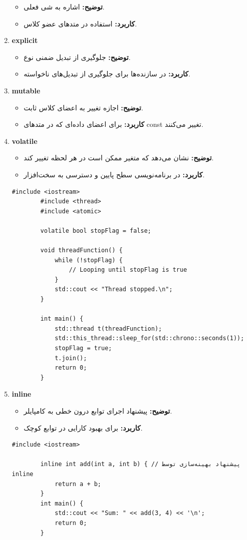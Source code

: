 \documentclass[12pt, a4paper]{report}
\begin{document}
\begin{enumerate}
\begin{itemize}
		\item \textbf{توضیح:} اشاره به شی فعلی.
		\item \textbf{کاربرد:} استفاده در متدهای عضو کلاس.
	\end{itemize}
	\item \textbf{explicit}
	\begin{itemize}
		\item \textbf{توضیح:} جلوگیری از تبدیل ضمنی نوع.
		\item \textbf{کاربرد:} در سازنده‌ها برای جلوگیری از تبدیل‌های ناخواسته.
	\end{itemize}
	\item \textbf{mutable}
	\begin{itemize}
		\item \textbf{توضیح:} اجازه تغییر به اعضای کلاس ثابت.
		\item \textbf{کاربرد:} برای اعضای داده‌ای که در متدهای const تغییر می‌کنند.
	\end{itemize}
	\item \textbf{volatile}
	\begin{itemize}
		\item \textbf{توضیح:} نشان می‌دهد که متغیر ممکن است در هر لحظه تغییر کند.
		\item \textbf{کاربرد:} در برنامه‌نویسی سطح پایین و دسترسی به سخت‌افزار.
	\end{itemize}
	\LTR
	\begin{lstlisting}[breaklines=true]
		#include <iostream>
		#include <thread>
		#include <atomic>
		
		volatile bool stopFlag = false;
		
		void threadFunction() {
			while (!stopFlag) {
				// Looping until stopFlag is true
			}
			std::cout << "Thread stopped.\n";
		}
		
		int main() {
			std::thread t(threadFunction);
			std::this_thread::sleep_for(std::chrono::seconds(1));
			stopFlag = true;
			t.join();
			return 0;
		}
	\end{lstlisting}
	\RTL
	\item \textbf{inline}
	\begin{itemize}
		\item \textbf{توضیح:} پیشنهاد اجرای توابع درون خطی به کامپایلر.
		\item \textbf{کاربرد:} برای بهبود کارایی در توابع کوچک.
	\end{itemize}
	\LTR
	\begin{lstlisting}[breaklines=true]
		#include <iostream>
		
		inline int add(int a, int b) { // پیشنهاد بهینه‌سازی توسط inline
			return a + b;
		}
		int main() {
			std::cout << "Sum: " << add(3, 4) << '\n';
			return 0;
		}
		

\end{lstlisting}
\end{enumerate}
\end{document}
